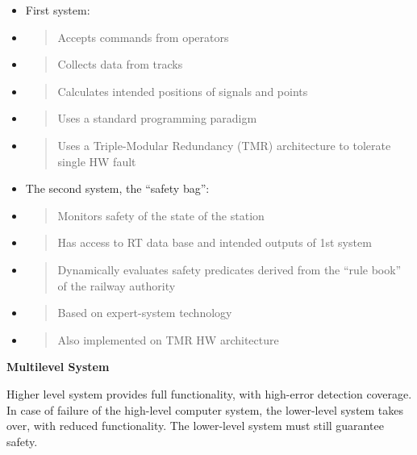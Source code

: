 \begin{itemize}
\item
  First system:
\item
  \begin{quote}
  Accepts commands from operators
  \end{quote}
\item
  \begin{quote}
  Collects data from tracks
  \end{quote}
\item
  \begin{quote}
  Calculates intended positions of signals and points
  \end{quote}
\item
  \begin{quote}
  Uses a standard programming paradigm
  \end{quote}
\item
  \begin{quote}
  Uses a Triple-Modular Redundancy (TMR) architecture to tolerate single
  HW fault
  \end{quote}
\item
  The second system, the ``safety bag'':
\item
  \begin{quote}
  Monitors safety of the state of the station
  \end{quote}
\item
  \begin{quote}
  Has access to RT data base and intended outputs of 1st system
  \end{quote}
\item
  \begin{quote}
  Dynamically evaluates safety predicates derived from the ``rule book''
  of the railway authority
  \end{quote}
\item
  \begin{quote}
  Based on expert-system technology
  \end{quote}
\item
  \begin{quote}
  Also implemented on TMR HW architecture
  \end{quote}
\end{itemize}

\textbf{Multilevel System}

Higher level system provides full functionality, with high-error
detection coverage. In case of failure of the high-level computer
system, the lower-level system takes over, with reduced functionality.
The lower-level system must still guarantee safety.

